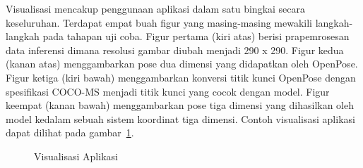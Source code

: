 Visualisasi mencakup penggunaan aplikasi dalam satu bingkai secara keseluruhan. Terdapat empat buah
figur yang masing-masing mewakili langkah-langkah pada tahapan uji coba. Figur pertama (kiri atas)
berisi prapemrosesan data inferensi dimana resolusi gambar diubah menjadi 290 x 290. Figur kedua
(kanan atas) menggambarkan pose dua dimensi yang didapatkan oleh OpenPose. Figur ketiga (kiri bawah)
menggambarkan konversi titik kunci OpenPose dengan spesifikasi COCO-MS menjadi titik kunci yang cocok
dengan model. Figur keempat (kanan bawah) menggambarkan pose tiga dimensi yang dihasilkan oleh model
kedalam sebuah sistem koordinat tiga dimensi. Contoh visualisasi aplikasi dapat dilihat pada
gambar~\ref{fig:vizapp}.

\begin{figure}[htbp]
    \begin{center}
    \end{center}
    \vspace{-20pt}
    \captionsetup{labelfont=bf, textfont=bf}
    \caption{Visualisasi Aplikasi}
    \vspace{-10pt}
    \captionsetup{labelfont=md, textfont=md}
    \label{fig:vizapp}
\end{figure}

